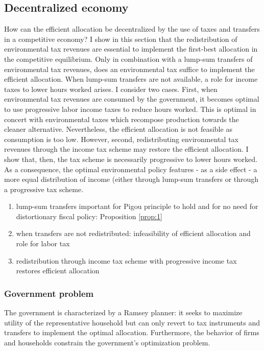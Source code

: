 \subsection{Decentralized economy}

How can the efficient allocation be decentralized by the use of taxes and transfers in a competitive economy? %
I show in this section that the redistribution of environmental tax revenues are essential to implement the first-best allocation in the competitive equilibrium. Only in combination with a lump-sum transfers of  environmental tax revenues, does an environmental tax suffice to implement the efficient allocation. 
When lump-sum transfers are not available, a role for income taxes to lower hours worked arises. I consider two cases.
First, when environmental tax revenues are consumed by the government, it becomes optimal to use progressive labor income taxes to reduce hours worked. This is optimal in concert with environmental taxes which recompose production towards the cleaner alternative.  Nevertheless, the efficient allocation is not feasible as consumption is too low.
However, second, redistributing environmental tax revenues through the income tax scheme may restore the efficient allocation. I show that, then, the tax scheme is necessarily progressive to lower hours worked.
As a consequence, the optimal environmental policy features - as a side effect - a more equal distribution of income (either through lump-sum transfers or through a progressive tax scheme.%

\begin{enumerate}
\item lump-sum transfers important for Pigou principle to hold and for no need for distortionary fiscal policy: Proposition \ref{prop:1}
\item when transfers are not redistributed: infeasibility of efficient allocation and role for labor tax
\item redistribution through income tax scheme with progressive income tax restores efficient allocation
\end{enumerate}

\subsubsection{Government problem}
The government is characterized by a Ramsey planner: it seeks to maximize utility of the representative household but can only revert to tax instruments and transfers to implement the optimal allocation. Furthermore, the behavior of firms and households constrain the government's optimization problem. 

